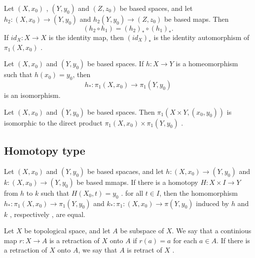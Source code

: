 \documentclass{article}
\theoremstyle{remark}
\begin{document}
\begin{theorem}[Functoriality]
   Let $\left( X, x_{0} \right)$ , $\left( Y ,y_{0} \right)$ and $\left( Z ,z_{0} \right)$ be based spaces, and let
   $h_{2}: \left( X, x_{0} \right) \to \left( Y, y_{0} \right)$ and $h_{2}\left( Y, y_{0} \right) \to  \left( Z, z_{0}
   \right)$ be based maps. Then \[
   \left( h_{2} \circ h_{1} \right) = \left( h_{2} \right)_{*} \circ \left( h_{1} \right)_{*}.
   \]
   If $id_{X} : X \to X$ is the identity map, then $\left( id_{X} \right)_{*}$ is the identity automorphism of $\pi
   _{1}\left( X,x_{0} \right)$ .
\end{theorem}

\begin{corollary}
    Let $\left( X, x_{0} \right)$  and $\left( Y ,y_{0} \right)$ be based spaces. If $h: X \to Y$ is a homeomorphism
    such that $h\left( x_{0} \right) = y_{0}$, then \[
        h_{*} : \pi _{1}\left( X, x_{0} \right) \to \pi _{1} \left( Y, y_{0} \right)
    \]
    is an isomorphism.
\end{corollary}

\begin{theorem}
    Let $\left( X,  x_{0} \right) $ and $\left( Y, y_{0} \right)$ be based spaces. Then $\pi _{1}\left( X \times Y,
    \left( x_{0}, y_{0} \right) \right)$ is isomorphic to the direct product $\pi _{1} \left( X, x_{0} \right) \times
    \pi _{1}\left( Y ,y_{0} \right)$ .
\end{theorem}

\subsection{Homotopy type}%
\label{sub:homotopy_type}

\begin{lemma}
    Let $\left( X, x_{0} \right)$ and $\left( Y,y_{0} \right)$ be based spacaes, and let $h: \left( X ,x_{0} \right) \to
    \left( Y,y_{0} \right)$ and $k: \left( X,x_{0} \right) \to \left( Y, y_{0} \right)$ be based mmaps. If there is a
    homotopy $H: X \times I \to Y$  from $h$  to $k$ such that $H\left( X_{0}, t \right) =  y_{0}$ . for all $t \in  I$,
    then the homomorphism $h_{*} : \pi _{1} \left( X, x_{0} \right) \to \pi _{1}\left( Y, y_{0} \right)$  and $k_{* } :
    \pi _{1} : \left( X ,x_{0} \right) \to \pi \left( Y, y_{0} \right) $ induced by $h$ and $k$ , respectively , are
    equal.
\end{lemma}

\begin{definition}[Retractions]
    Let $X$ be topological space, and let $A$ be subspace of $X$.  We say that a continious map $r: X \to A$ is a
    retraction of $X$  onto $A$ if $r\left( a \right) = a$ for each $a \in  A$. If there is a retraction of $X$ onto
    $A$, we say that $A$ is retract of $X$ .
\end{definition}
\end{document}
